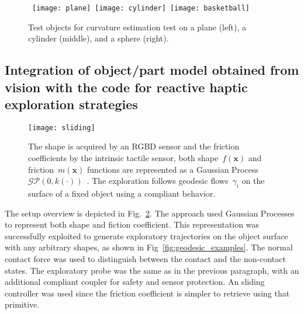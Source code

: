 \begin{figure}[!h]
    \centering
    \mbox{
    \texttt{[image: plane]}
    \texttt{[image: cylinder]}
    \texttt{[image: basketball]}
    }
    \caption{Test objects for curvature estimation test on a plane (left), a cylinder (middle), and a sphere (right).}
    \label{fig:curvature}
    \vspace{9pt}
\end{figure}



\subsection{Integration of object/part model obtained from vision with the code for reactive haptic exploration strategies}
\label{sec:end}

\begin{figure}[!b]
  \begin{center}
    \texttt{[image: sliding]}
  \end{center}
  \caption{The shape is acquired by an RGBD sensor and the friction coefficients by the intrinsic tactile sensor, both shape~$f(\mathbf{x})$ and friction~$m(\mathbf{x})$ functions are represented as a Gaussian Process $\mathcal{GP}(0,k(\cdot))$~\cite{Rasmussen2006Gaussian}. The exploration follows geodesic flows~$\gamma_i$ on the surface of a fixed object using a compliant behavior.}
  \label{fig:schema}
\end{figure}

The setup overview is depicted in Fig.~\ref{fig:schema}. The approach used Gaussian Processes to represent both shape and fiction coefficient. This representation was successfully exploited to generate exploratory trajectories on the object surface with any arbitrary shapes, as shown in Fig~\ref{fig:geodesic_examples}. The normal contact force was used to distinguish between the contact and the non-contact states. The exploratory probe was the same as in the previous paragraph, with an additional compliant coupler for safety and sensor protection. An sliding controller was used since the friction coefficient is simpler to retrieve using that primitive.


